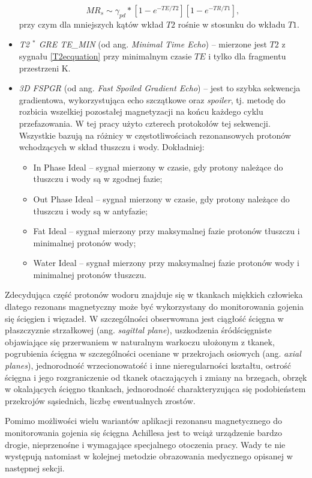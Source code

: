 \begin{itemize}
\begin{equation}
	MR_s \sim \gamma_{pd} \ast [1-e^{-TE/T2}][1-e^{-TR/T1}],
	\end{equation}
	przy czym dla mniejszych kątów wkład $T2$ rośnie w stosunku do wkładu $T1$.
	\item \textit{T2 $^\ast$ GRE TE\_MIN} (od ang. \textit{Minimal Time Echo}) -- mierzone jest $T2$ z sygnału \ref{T2ecquation} przy minimalnym czasie $TE$ i tylko dla fragmentu przestrzeni K. 
	\item \textit{3D FSPGR} (od ang. \textit{Fast Spoiled Gradient Echo}) -- jest to szybka sekwencja gradientowa, wykorzystująca echo szczątkowe oraz \textit{spoiler}, tj. metodę do rozbicia wszelkiej pozostałej magnetyzacji na końcu każdego cyklu przefazowania. W tej pracy użyto czterech protokołów tej sekwencji. Wszystkie bazują na różnicy w częstotliwościach rezonansowych protonów wchodzących w skład tłuszczu i wody. Dokładniej:
	\begin{itemize}
		\item In Phase Ideal -- sygnał mierzony w czasie, gdy protony należące do tłuszczu i wody są w zgodnej fazie;
		\item Out Phase Ideal -- sygnał mierzony w czasie, gdy protony należące do tłuszczu i wody są w antyfazie;
		\item Fat Ideal -- sygnał mierzony przy maksymalnej fazie protonów tłuszczu i minimalnej protonów wody;
		\item Water Ideal -- sygnał mierzony przy maksymalnej fazie protonów wody i minimalnej protonów tłuszczu.
	\end{itemize}
\end{itemize}

Zdecydująca część protonów wodoru znajduje się w tkankach miękkich człowieka dlatego rezonans magnetyczny może być wykorzystany do monitorowania gojenia się ścięgien i więzadeł. W szczególności obserwowana jest ciągłość ścięgna w płaszczyznie strzałkowej (ang. \textit{sagittal plane}), uszkodzenia śródścięgniste objawiające się przerwaniem w naturalnym warkoczu ułożonym z tkanek, pogrubienia ścięgna w szczególności oceniane w przekrojach osiowych (ang. \textit{axial planes}), jednorodność wrzecionowatość i inne nieregularności kształtu, ostrość ścięgna i jego rozgraniczenie od tkanek otaczających i zmiany na brzegach, obrzęk w okalających ścięgno tkankach, jednorodność charakteryzująca się podobieństem przekrojów sąsiednich, liczbę ewentualnych zrostów.

Pomimo możliwości wielu wariantów aplikacji rezonansu magnetycznego do monitorowania gojenia się ścięgna Achillesa jest to wciąż urządzenie bardzo drogie, nieprzenośne i wymagające specjalnego otoczenia pracy. Wady te nie występują natomiast w kolejnej metodzie obrazowania medycznego opisanej w następnej sekcji. 

